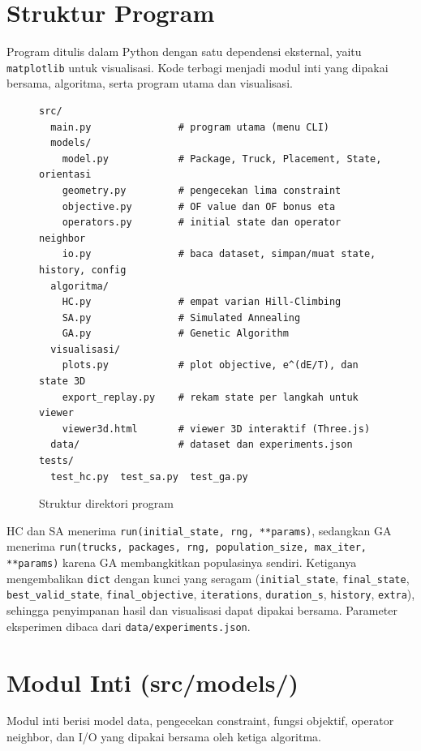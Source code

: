 \documentclass[12pt,a4paper]{report}
\newcommand{\code}[1]{\texttt{\small #1}}
\begin{document}
\section{Struktur Program}
Program ditulis dalam Python dengan satu dependensi eksternal, yaitu \code{matplotlib} untuk
visualisasi. Kode terbagi menjadi modul inti yang dipakai bersama, algoritma, serta program utama
dan visualisasi.

\begin{figure}[H]
\centering
\begin{lstlisting}[frame=single]
src/
  main.py               # program utama (menu CLI)
  models/
    model.py            # Package, Truck, Placement, State, orientasi
    geometry.py         # pengecekan lima constraint
    objective.py        # OF value dan OF bonus eta
    operators.py        # initial state dan operator neighbor
    io.py               # baca dataset, simpan/muat state, history, config
  algoritma/
    HC.py               # empat varian Hill-Climbing
    SA.py               # Simulated Annealing
    GA.py               # Genetic Algorithm
  visualisasi/
    plots.py            # plot objective, e^(dE/T), dan state 3D
    export_replay.py    # rekam state per langkah untuk viewer
    viewer3d.html       # viewer 3D interaktif (Three.js)
  data/                 # dataset dan experiments.json
tests/
  test_hc.py  test_sa.py  test_ga.py
\end{lstlisting}
\caption{Struktur direktori program}
\end{figure}

HC dan SA menerima \code{run(initial\_state, rng, **params)}, sedangkan GA menerima
\code{run(trucks, packages, rng, population\_size, max\_iter, **params)} karena GA membangkitkan
populasinya sendiri. Ketiganya mengembalikan \code{dict} dengan kunci yang seragam
(\code{initial\_state}, \code{final\_state}, \code{best\_valid\_state}, \code{final\_objective},
\code{iterations}, \code{duration\_s}, \code{history}, \code{extra}), sehingga penyimpanan hasil
dan visualisasi dapat dipakai bersama. Parameter eksperimen dibaca dari \code{data/experiments.json}.

\section{Modul Inti (src/models/)}
Modul inti berisi model data, pengecekan constraint, fungsi objektif, operator neighbor, dan I/O
yang dipakai bersama oleh ketiga algoritma.
\end{document}
